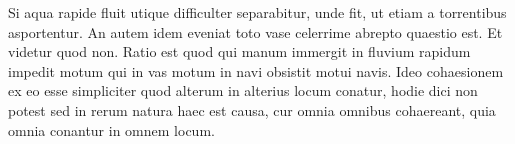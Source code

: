 Si aqua rapide fluit utique difficulter separabitur, unde fit, ut etiam  a torrentibus asportentur. An autem idem eveniat toto vase celerrime abrepto quaestio est. Et videtur quod non. Ratio est quod qui manum immergit in fluvium rapidum impedit motum qui in vas motum in navi  obsistit motui navis. Ideo cohaesionem ex eo esse simpliciter quod alterum in alterius locum conatur, hodie dici non potest sed in rerum natura haec est causa, cur omnia omnibus cohaereant, quia omnia conantur in omnem locum.\pend
\count{}
 



